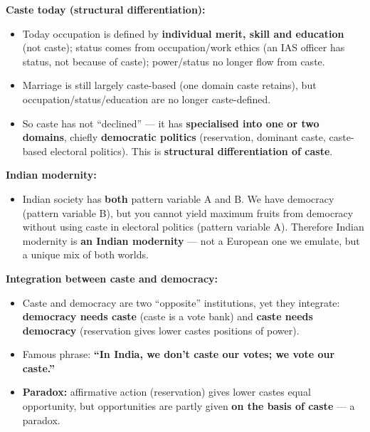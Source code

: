 \begin{ExampleBox}
\textbf{Caste today (structural differentiation):}
\begin{itemize}
\item Today occupation is defined by \textbf{individual merit, skill and education} (not caste); status comes from occupation/work ethics (an IAS officer has status, not because of caste); power/status no longer flow from caste.
\item Marriage is still largely caste-based (one domain caste retains), but occupation/status/education are no longer caste-defined.
\item So caste has not ``declined'' --- it has \textbf{specialised into one or two domains}, chiefly \textbf{democratic politics} (reservation, dominant caste, caste-based electoral politics). This is \textbf{structural differentiation of caste}.
\end{itemize}
\end{ExampleBox}

\begin{CriticalPoint}
\textbf{Indian modernity:}
\begin{itemize}
\item Indian society has \textbf{both} pattern variable A and B. We have democracy (pattern variable B), but you cannot yield maximum fruits from democracy without using caste in electoral politics (pattern variable A). Therefore Indian modernity is \textbf{an Indian modernity} --- not a European one we emulate, but a unique mix of both worlds.
\end{itemize}
\end{CriticalPoint}

\begin{ComparisonBox}
\textbf{Integration between caste and democracy:}
\begin{itemize}
\item Caste and democracy are two ``opposite'' institutions, yet they integrate: \textbf{democracy needs caste} (caste is a vote bank) and \textbf{caste needs democracy} (reservation gives lower castes positions of power).
\item Famous phrase: \textbf{``In India, we don't caste our votes; we vote our caste.''}
\item \textbf{Paradox:} affirmative action (reservation) gives lower castes equal opportunity, but opportunities are partly given \textbf{on the basis of caste} --- a paradox.
\end{itemize}
\end{ComparisonBox}

